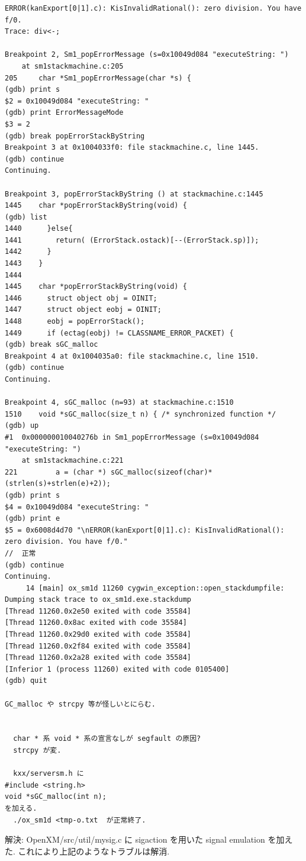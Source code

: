 \documentclass{jarticle}
\begin{document}
{\begin{verbatim}
ERROR(kanExport[0|1].c): KisInvalidRational(): zero division. You have f/0.
Trace: div<-;

Breakpoint 2, Sm1_popErrorMessage (s=0x10049d084 "executeString: ")
    at sm1stackmachine.c:205
205     char *Sm1_popErrorMessage(char *s) {
(gdb) print s
$2 = 0x10049d084 "executeString: "
(gdb) print ErrorMessageMode
$3 = 2
(gdb) break popErrorStackByString
Breakpoint 3 at 0x1004033f0: file stackmachine.c, line 1445.
(gdb) continue
Continuing.

Breakpoint 3, popErrorStackByString () at stackmachine.c:1445
1445    char *popErrorStackByString(void) {
(gdb) list
1440      }else{
1441        return( (ErrorStack.ostack)[--(ErrorStack.sp)]);
1442      }
1443    }
1444
1445    char *popErrorStackByString(void) {
1446      struct object obj = OINIT;
1447      struct object eobj = OINIT;
1448      eobj = popErrorStack();
1449      if (ectag(eobj) != CLASSNAME_ERROR_PACKET) {
(gdb) break sGC_malloc
Breakpoint 4 at 0x1004035a0: file stackmachine.c, line 1510.
(gdb) continue
Continuing.

Breakpoint 4, sGC_malloc (n=93) at stackmachine.c:1510
1510    void *sGC_malloc(size_t n) { /* synchronized function */
(gdb) up
#1  0x000000010040276b in Sm1_popErrorMessage (s=0x10049d084 "executeString: ")
    at sm1stackmachine.c:221
221         a = (char *) sGC_malloc(sizeof(char)*(strlen(s)+strlen(e)+2));
(gdb) print s
$4 = 0x10049d084 "executeString: "
(gdb) print e
$5 = 0x6008d4d70 "\nERROR(kanExport[0|1].c): KisInvalidRational(): zero division. You have f/0."
//  正常
(gdb) continue
Continuing.
     14 [main] ox_sm1d 11260 cygwin_exception::open_stackdumpfile: Dumping stack trace to ox_sm1d.exe.stackdump
[Thread 11260.0x2e50 exited with code 35584]
[Thread 11260.0x8ac exited with code 35584]
[Thread 11260.0x29d0 exited with code 35584]
[Thread 11260.0x2f84 exited with code 35584]
[Thread 11260.0x2a28 exited with code 35584]
[Inferior 1 (process 11260) exited with code 0105400]
(gdb) quit

GC_malloc や strcpy 等が怪しいとにらむ.
  

  char * 系 void * 系の宣言なしが segfault の原因?
  strcpy が変.
  
  kxx/serversm.h に
#include <string.h>
void *sGC_malloc(int n);
を加える.
  ./ox_sm1d <tmp-o.txt  が正常終了.
\end{verbatim}
} %

\noindent
解決: OpenXM/src/util/mysig.c に sigaction を用いた signal emulation を加えた.
これにより上記のようなトラブルは解消.
\end{document}
